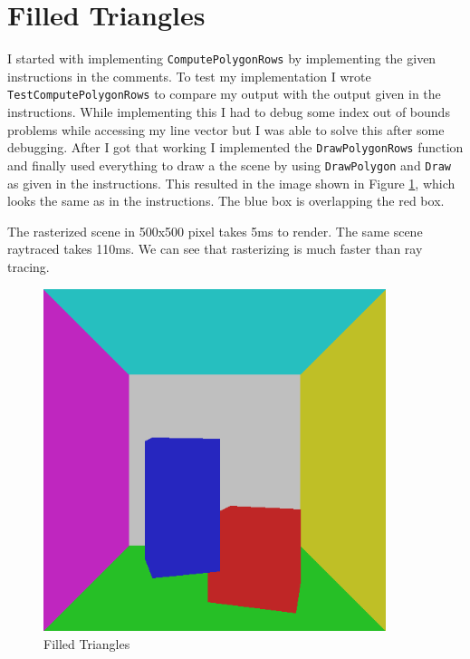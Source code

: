 \section{Filled Triangles}
I started with implementing \texttt{ComputePolygonRows} by implementing the given instructions in the comments.
To test my implementation I wrote \texttt{TestComputePolygonRows} to compare my output with the output
given in the instructions. While implementing this I had to debug some index out of bounds problems while
accessing my line vector but I was able to solve this after some debugging.
After I got that working I implemented the \texttt{DrawPolygonRows} function and finally used everything
to draw a the scene by using \texttt{DrawPolygon} and \texttt{Draw} as given in the instructions. This resulted in the image
shown in Figure \ref{fig:filledTriangles}, which looks the same as in the instructions. The blue box is overlapping the red box.

The rasterized scene in 500x500 pixel takes 5ms to render. The same scene raytraced takes 110ms.
We can see that rasterizing is much faster than ray tracing.
\begin{figure}[ht]
    \centering
    \includegraphics[width=10cm]{screenshots/filled_triangles.png}
    \caption{Filled Triangles}
    \label{fig:filledTriangles}
\end{figure}

